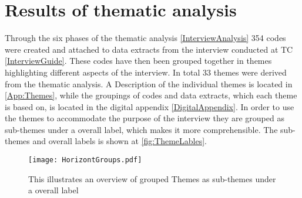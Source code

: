 \chapter{Results of thematic analysis}
\label{ThemanticAnalysis}


\noindent
Through the six phases of the thematic analysis \autoref{InterviewAnalysis} 354 codes were created and attached to data extracts from the interview conducted at TC \autoref{InterviewGuide}. These codes have then been grouped together in themes highlighting different aspects of the interview. In total 33 themes were derived from the thematic analysis. A Description of the individual themes is located in \autoref{App:Themes}, while the groupings of codes and data extracts, which each theme is based on, is located in the digital appendix \autoref{DigitalAppendix}. In order to use the themes to accommodate the purpose of the interview they are grouped as sub-themes under a overall label, which makes it more comprehensible. The sub-themes and overall labels is shown at \autoref{fig:ThemeLables}.

\begin{figure}[H]
	\centering
	\texttt{[image: HorizontGroups.pdf]}
	\caption{This illustrates an overview of grouped Themes as sub-themes under a overall label}
	\label{fig:ThemeLables}
\end{figure}

